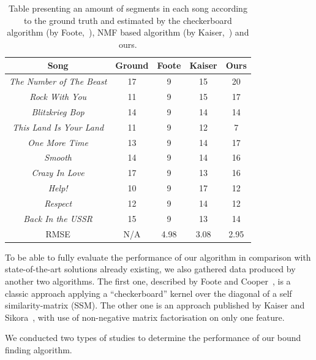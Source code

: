 \begin{table}
\begin{center}
\begin{tabular}{| c | c | c | c | c | } \hline 
Song  											& Ground	& Foote 	&  Kaiser 	& Ours \\ \hline \hline
\textit{The Number of The Beast} 	&	17			& 	9  			&  15 		&  20   	\\ \hline
\textit{Rock With You}						&	11			&  9			&  15 		& 17   	\\ \hline
\textit{Blitzkrieg Bop} 						&	14			&  9  			&  14 		& 14   	\\ \hline
\textit{This Land Is Your Land} 		&	11			&  9			&  12 		& 7    	\\ \hline
\textit{One More Time}					&	13			&  9    		&  14 		& 17   	\\ \hline
\textit{Smooth}								&	14			&  9  			&  14 		& 16  	\\ \hline
\textit{Crazy In Love}						&	17			&  9  			&  13  		& 16   	\\ \hline
\textit{Help!}									&	10			&  9		   	&  17 		& 12   	\\ \hline
\textit{Respect}								&	12			&  9  			&  14 		& 12  	\\ \hline
\textit{Back In the USSR}				&	15			&  9  			&  13		    	& 14		\\ \hline \hline
RMSE											&	N/A		& 4.98		&  3.08		& 2.95	\\ \hline 

\end{tabular}
\caption{Table presenting an amount of segments in each song according to the ground truth and estimated by the checkerboard algorithm (by Foote,~\cite{FooteCooper}), NMF based algorithm (by Kaiser,~\cite{Sikora}) and ours.}
\label{table:evalStructureCount}
\end{center}
\end{table}

To be able to fully evaluate the performance of our algorithm in comparison with state-of-the-art solutions already existing, we also gathered data produced by another two algorithms. The first one, described by Foote and Cooper~\cite{FooteCooper}, is a classic approach applying a ``checkerboard'' kernel over the diagonal of a self similarity-matrix (SSM). The other one is an approach published by Kaiser and Sikora~\cite{Sikora}, with use of non-negative matrix factorisation on only one feature. 

We conducted two types of studies to determine the performance of our bound finding algorithm.

